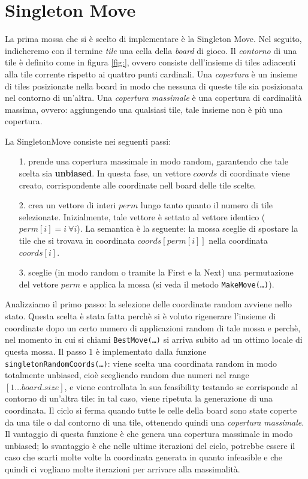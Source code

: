 \section{Singleton Move} %
\label{sec:singleton_move}

    La prima mossa che si è scelto di implementare è la Singleton Move. Nel seguito, indicheremo con il termine \textit{tile} una cella della \textit{board} di gioco. Il \textit{contorno} di una tile è definito come in figura \ref{fig:}, ovvero consiste dell'insieme di tiles adiacenti alla tile corrente rispetto ai quattro punti cardinali. Una \textit{copertura} è un insieme di tiles posizionate nella board in modo che nessuna di queste tile sia posizionata nel contorno di un'altra. Una \textit{copertura massimale} è una copertura di cardinalità massima, ovvero: aggiungendo una qualsiasi tile, tale insieme non è più una copertura.

    La SingletonMove consiste nei seguenti passi:
    \begin{itemize}
    	\item[1.] prende una copertura massimale in modo random, garantendo che tale scelta sia \textbf{unbiased}. In questa fase, un vettore $coords$ di coordinate viene creato, corrispondente alle coordinate nell board delle tile scelte. 
    	\item[2.] crea un vettore di interi $perm$ lungo tanto quanto il numero di tile selezionate. Inizialmente, tale vettore è settato al vettore identico ($perm[i] = i \ \forall i$). La semantica è la seguente: la mossa sceglie di spostare la tile che si trovava in coordinata $coords[perm[i]]$ nella coordinata $coords[i]$.
    	\item[3.] sceglie (in modo random o tramite la First e la Next) una permutazione del vettore $perm$ e applica la mossa (si veda il metodo \texttt{MakeMove(\dots)}).
    \end{itemize}

    Analizziamo il primo passo: la selezione delle coordinate random avviene nello stato. Questa scelta è stata fatta perchè si è voluto rigenerare l'insieme di coordinate dopo un certo numero di applicazioni random di tale mossa e perchè, nel momento in cui si chiami \texttt{BestMove(\dots)} si arriva subito ad un ottimo locale di questa mossa. Il passo $1$ è implementato dalla funzione \texttt{singletonRandomCoords(\dots)}: viene scelta una coordinata random in modo totalmente unbiased, cioè scegliendo random due numeri nel range $[1 \dots board.size]$, e viene controllata la sua feasibility testando se corrisponde al contorno di un'altra tile: in tal caso, viene ripetuta la generazione di una coordinata. Il ciclo si ferma quando tutte le celle della board sono state coperte da una tile o dal contorno di una tile, ottenendo quindi una \textit{copertura massimale}. Il vantaggio di questa funzione è che genera una copertura massimale in modo unbiased; lo svantaggio è che nelle ultime iterazioni del ciclo, potrebbe essere il caso che scarti molte volte la coordinata generata in quanto infeasible e che quindi ci vogliano molte iterazioni per arrivare alla massimalità.

